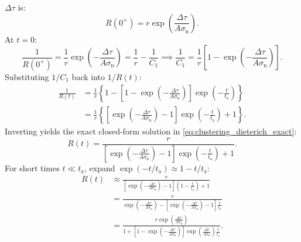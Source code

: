 $\Delta\tau$ is:
\begin{equation}
  R(0^+) = r \exp\left( \frac{\Delta\tau}{A\sigma_{\mathrm{n}}} \right).
\end{equation}
At $t = 0$:
\begin{equation}
  \frac{1}{R(0^+)} = \frac{1}{r}
  \exp\left(-\frac{\Delta\tau}{A\sigma_{\mathrm{n}}}\right) =
  \frac{1}{r} - \frac{1}{C_1}
  \implies \frac{1}{C_1} = \frac{1}{r}\left[ 1 -
  \exp\left(-\frac{\Delta\tau}{A\sigma_{\mathrm{n}}}\right) \right].
\end{equation}
Substituting $1/C_1$ back into $1/R(t)$:
\begin{equation}
  \begin{aligned}
    \frac{1}{R(t)} &= \frac{1}{r}\left\{ 1 - \left[ 1 -
        \exp\left(-\frac{\Delta\tau}{A\sigma_{\mathrm{n}}}\right)
    \right] \exp\left(-\frac{t}{t_{\mathrm{a}}}\right) \right\} \\
    &= \frac{1}{r}\left\{ \left[
        \exp\left(-\frac{\Delta\tau}{A\sigma_{\mathrm{n}}}\right) - 1
    \right]\exp\left(-\frac{t}{t_{\mathrm{a}}}\right) + 1 \right\}.
  \end{aligned}
\end{equation}
Inverting yields the exact closed-form solution in
\cref{eq:clustering_dieterich_exact}:
\begin{equation}
  R(t) = \frac{r}{\left[
      \exp\left(-\frac{\Delta\tau}{A\sigma_{\mathrm{n}}}\right) - 1
  \right] \exp\left(-\frac{t}{t_{\mathrm{a}}}\right) + 1}.
\end{equation}
For short times $t \ll t_{\mathrm{a}}$, expand
$\exp(-t/t_{\mathrm{a}}) \approx 1 - t/t_{\mathrm{a}}$:
\begin{equation}
  \begin{aligned}
    R(t) &\approx \frac{r}{\left[
        \exp\left(-\frac{\Delta\tau}{A\sigma_{\mathrm{n}}}\right) - 1
    \right] \left(1 - \frac{t}{t_{\mathrm{a}}}\right) + 1} \\
    &=
    \frac{r}{\exp\left(-\frac{\Delta\tau}{A\sigma_{\mathrm{n}}}\right)
      -
      \left[\exp\left(-\frac{\Delta\tau}{A\sigma_{\mathrm{n}}}\right)
    - 1\right]\frac{t}{t_{\mathrm{a}}}} \\
    &= \frac{r
    \exp\left(\frac{\Delta\tau}{A\sigma_{\mathrm{n}}}\right)}{1 +
      \left[1 -
      \exp\left(-\frac{\Delta\tau}{A\sigma_{\mathrm{n}}}\right)\right]
      \exp\left(\frac{\Delta\tau}{A\sigma_{\mathrm{n}}}\right)
    \frac{t}{t_{\mathrm{a}}}}.
  \end{aligned}
\end{equation}
